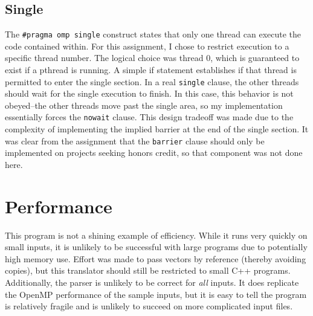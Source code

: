\documentclass[]{article}
\begin{document}
\subsection{Single}
The \texttt{\#pragma omp single} construct states that only one thread can execute the code contained within. For this assignment, I chose to restrict execution to a specific thread number. The logical choice was thread 0, which is guaranteed to exist if a pthread is running. A simple if statement establishes if that thread is permitted to enter the single section. In a real \texttt{single} clause, the other threads should wait for the single execution to finish. In this case, this behavior is not obeyed--the other threads move past the single area, so my implementation essentially forces the \texttt{nowait} clause. This design tradeoff was made due to the complexity of implementing the implied barrier at the end of the single section. It was clear from the assignment that the \texttt{barrier} clause should only be implemented on projects seeking honors credit, so that component was not done here.

\section{Performance}
This program is not a shining example of efficiency. While it runs very quickly on small inputs, it is unlikely to be successful with large programs due to potentially high memory use. Effort was made to pass vectors by reference (thereby avoiding copies), but this translator should still be restricted to small C++ programs. Additionally, the parser is unlikely to be correct for \emph{all} inputs. It does replicate the OpenMP performance of the sample inputs, but it is easy to tell the program is relatively fragile and is unlikely to succeed on more complicated input files.
\end{document}

